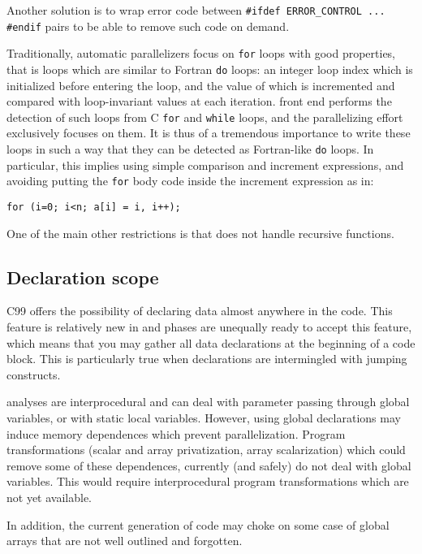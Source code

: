 \documentclass[a4paper]{article}
\begin{document}
Another solution is to wrap error code between %
\lstinline|#ifdef ERROR_CONTROL ... #endif| pairs to be able to
remove such code on demand.


Traditionally, automatic parallelizers focus on \texttt{for} loops
with good properties, that is loops which are similar to Fortran
\texttt{do} loops: an integer loop index which is initialized before
entering the loop, and the value of which is incremented and compared
with loop-invariant values at each iteration. \Apips front end
performs the detection of such loops from C \texttt{for} and
\texttt{while} loops, and the parallelizing effort exclusively focuses
on them. It is thus of a tremendous importance to write these loops in
such a way that they can be detected as Fortran-like \texttt{do}
loops. In particular, this implies using simple comparison and
increment expressions, and avoiding putting the \texttt{for} body code
inside the increment expression as in:
\begin{lstlisting}
for (i=0; i<n; a[i] = i, i++);
\end{lstlisting}


One of the main other restrictions is that \Apips does not handle
recursive functions.


\subsection{Declaration scope}
\label{sec:declaration-scope}

C99 offers the possibility of declaring data almost anywhere in the
code. This feature is relatively new in \Apips and phases are
unequally ready to accept this feature, which means that you may
gather all data declarations at the beginning of a code block. This is
particularly true when declarations are intermingled with jumping
constructs.

\Apips analyses are interprocedural and can deal with parameter
passing through global variables, or with static local
variables. However, using global declarations may induce memory
dependences which prevent parallelization. Program transformations
(scalar and array privatization, array scalarization) which could
remove some of these dependences, currently (and safely) do not deal
with global variables. This would require interprocedural program
transformations which are not yet available.

In addition, the current generation of \Agpu code may choke on some
case of global arrays that are not well outlined and forgotten.
\end{document}
